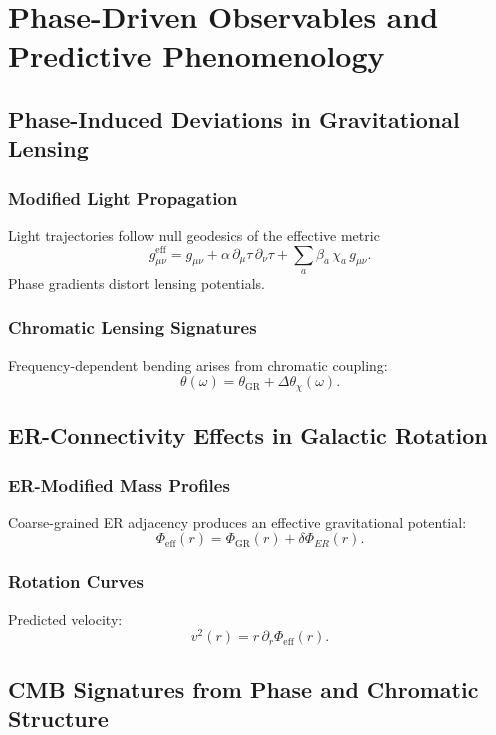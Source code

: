 

\part{Phase-Driven Observables and Predictive Phenomenology}

\chapter{Phase-Induced Deviations in Gravitational Lensing}

\section{Modified Light Propagation}
Light trajectories follow null geodesics of the effective metric
\[
g_{\mu\nu}^{\mathrm{eff}} = g_{\mu\nu} + \alpha\,\partial_\mu\tau\,\partial_\nu\tau 
+ \sum_a \beta_a\,\chi_a\,g_{\mu\nu}.
\]
Phase gradients distort lensing potentials.

\section{Chromatic Lensing Signatures}
Frequency-dependent bending arises from chromatic coupling:
\[
\theta(\omega)=\theta_{\mathrm{GR}}+\Delta\theta_{\chi}(\omega).
\]

\chapter{ER-Connectivity Effects in Galactic Rotation}

\section{ER-Modified Mass Profiles}
Coarse-grained ER adjacency produces an effective gravitational potential:
\[
\Phi_{\mathrm{eff}}(r)=\Phi_{\mathrm{GR}}(r)+\delta\Phi_{ER}(r).
\]

\section{Rotation Curves}
Predicted velocity:
\[
v^2(r)=r\,\partial_r\Phi_{\mathrm{eff}}(r).
\]

\chapter{CMB Signatures from Phase and Chromatic Structure}

